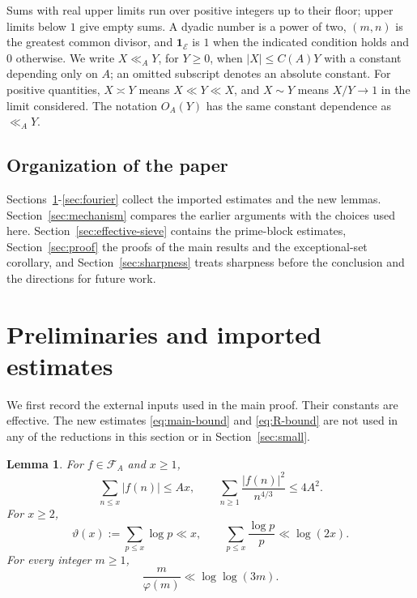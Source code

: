 \documentclass[11pt]{amsart}
\numberwithin{equation}{section}
\numberwithin{figure}{section}
\newtheorem{lemma}{Lemma}[section]
\theoremstyle{definition}
\newcommand{\FA}{\mathcal F_A}
\newcommand{\ind}{\mathbf 1}
\begin{document}
Sums with real upper limits run over positive integers up to their
floor; upper limits below $1$ give empty sums. A dyadic number is a
power of two, $(m,n)$ is the greatest common divisor, and
$\ind_{\mathcal E}$ is $1$ when the indicated condition holds and $0$
otherwise. We write $X\ll_A Y$, for $Y\ge0$, when $|X|\le C(A)Y$ with
a constant depending only on $A$; an omitted subscript denotes an
absolute constant. For positive quantities, $X\asymp Y$ means
$X\ll Y\ll X$, and $X\sim Y$ means $X/Y\to1$ in the limit considered.
The notation $O_A(Y)$ has the same constant dependence as $\ll_A Y$.

\subsection{Organization of the paper}

Sections~\ref{sec:inputs}-\ref{sec:fourier} collect the imported
estimates and the new lemmas. Section~\ref{sec:mechanism} compares
the earlier arguments with the choices used here.
Section~\ref{sec:effective-sieve} contains the prime-block estimates,
Section~\ref{sec:proof} the proofs of the main results and the
exceptional-set corollary, and Section~\ref{sec:sharpness} treats
sharpness before the conclusion and the directions for future work.

\section{Preliminaries and imported estimates}\label{sec:inputs}

We first record the external inputs used in the main proof.
Their constants are effective. The new estimates
\eqref{eq:main-bound} and \eqref{eq:R-bound} are not used in any of the
reductions in this section or in Section~\ref{sec:small}.

\begin{lemma}\label{lem:elementary}
For $f\in\FA$ and $x\ge1$,
\begin{equation}\label{eq:l1-l2}
 \sum_{n\le x}|f(n)|\le Ax,
 \qquad
 \sum_{n\ge1}\frac{|f(n)|^2}{n^{4/3}}\le4A^2.
\end{equation}
For $x\ge2$,
\begin{equation}\label{eq:prime-elementary}
 \vartheta(x):=\sum_{p\le x}\log p\ll x,
 \qquad
 \sum_{p\le x}\frac{\log p}{p}\ll\log(2x).
\end{equation}
For every integer $m\ge1$,
\begin{equation}\label{eq:totient}
 \frac m{\varphi(m)}\ll\log\log(3m).
\end{equation}
\end{lemma}
\end{document}
